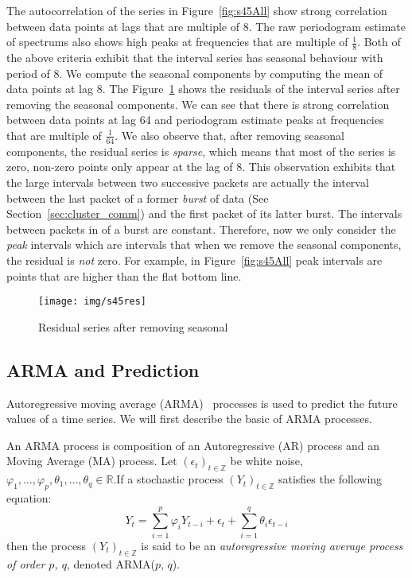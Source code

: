 \documentclass[12pt]{article}
\begin{document}
The autocorrelation of the series in Figure~\ref{fig:s45All} show strong
correlation between data points at lags that are multiple of 8. The raw
periodogram estimate of spectrums also shows high peaks at frequencies that are
multiple of $\frac{1}{8}$. Both of the above criteria exhibit that the interval
series has seasonal behaviour with period of 8. We compute the seasonal
components by computing the mean of data points at lag 8. The
Figure~\ref{fig:s45res} shows the residuals of the interval series after
removing the seasonal components. We can see that there is strong correlation
between data points at lag 64 and periodogram estimate peaks at frequencies
that are multiple of $\frac{1}{64}$. We also observe that, after removing
seasonal components, the residual series is \textit{sparse}, which means that
most of the series is zero, non-zero points only appear at the lag of 8. This
observation exhibits that the large intervals between two successive packets are
actually the interval between the last packet of a former \textit{burst} of data
(See Section~\ref{sec:cluster_comm}) and the first packet of its latter burst.
The intervals between packets in of a burst are constant. Therefore, now we only
consider the \textit{peak} intervals which are intervals that when we remove
the seasonal components, the residual is \textit{not} zero. For example, in
Figure~\ref{fig:s45All} peak intervals are points that are higher than the flat
bottom line.

\begin{figure}[ht!]
\centering
\texttt{[image: img/s45res]}
\caption{Residual series after removing seasonal}\label{fig:s45res}
\end{figure}



\subsection{ARMA and Prediction}
Autoregressive moving average (ARMA)~\cite{BoxTimeSeries, FalkStatSAS}
 processes is used to predict the future values of a time series. We will first
 describe the basic of ARMA processes.
 
 An ARMA process is composition of an Autoregressive (AR) process and an Moving
 Average (MA) process. Let $(\epsilon_t)_{t\in \mathbb{Z}}$ be white noise,
 $\varphi_1, \ldots, \varphi_p, \theta_1, \ldots, \theta_q\in\mathbb{R}$.If a
stochastic process $(Y_t)_{t\in \mathbb{Z}}$ satisfies the following
 equation:
 \begin{equation}\label{eqn:ARMA}
 Y_t=\sum_{i=1}^{p}\varphi_iY_{t-i}+
 \epsilon_t +\sum_{i=1}^{q}\theta_i\epsilon_{t-i}
 \end{equation}
then the process $(Y_t)_{t\in \mathbb{Z}}$ is said to be
an \textit{autoregressive moving average process of order $p$, $q$}, denoted
ARMA($p$, $q$).
\end{document}
